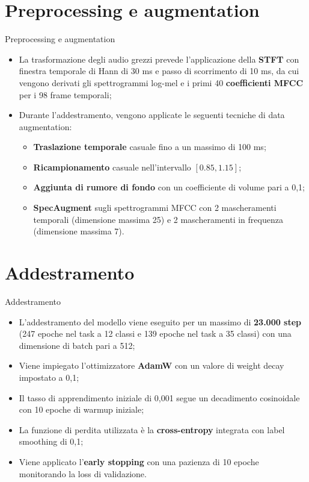 \documentclass[aspectratio=169]{beamer}
\begin{document}
\section{Preprocessing e augmentation}

\begin{frame}{Preprocessing e augmentation} 
  \begin{itemize}
    \item La trasformazione degli audio grezzi prevede l'applicazione della \textbf{STFT} con finestra temporale di Hann di 30 ms e passo di scorrimento di 10 ms, da cui vengono derivati gli spettrogrammi log-mel e i primi 40 \textbf{coefficienti MFCC} per i 98 frame temporali;
    \item Durante l'addestramento, vengono applicate le seguenti tecniche di data augmentation:
    \begin{itemize}
      \item \textbf{Traslazione temporale} casuale fino a un massimo di 100 ms;
      \item \textbf{Ricampionamento} casuale nell'intervallo $[0.85, 1.15]$;
      \item \textbf{Aggiunta di rumore di fondo} con un coefficiente di volume pari a 0,1;
      \item \textbf{SpecAugment} \cite{Park_2019} sugli spettrogrammi MFCC con 2 mascheramenti temporali (dimensione massima 25) e 2 mascheramenti in frequenza (dimensione massima 7).
    \end{itemize}
  \end{itemize}
\end{frame}

\section{Addestramento}

\begin{frame}{Addestramento}
  \begin{itemize}
   \item L'addestramento del modello viene eseguito per un massimo di \textbf{23.000 step} (247 epoche nel task a 12 classi e 139 epoche nel task a 35 classi) con una dimensione di batch pari a 512;
   \item Viene impiegato l'ottimizzatore \textbf{AdamW} con un valore di weight decay impostato a 0,1;
   \item Il tasso di apprendimento iniziale di 0,001 segue un decadimento cosinoidale con 10 epoche di warmup iniziale;
   \item La funzione di perdita utilizzata è la \textbf{cross-entropy} integrata con label smoothing di 0,1;
   \item Viene applicato l'\textbf{early stopping} con una pazienza di 10 epoche monitorando la loss di validazione.
  \end{itemize}
\end{frame}
\end{document}

